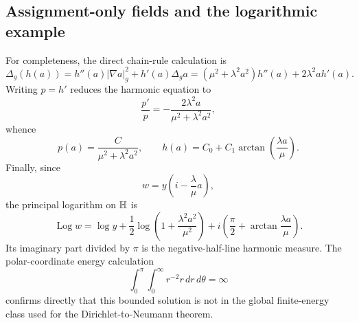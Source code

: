 \subsection{Assignment-only fields and the logarithmic example}

For completeness, the direct chain-rule calculation is
\[
 \Delta_g(h(a))
 =h''(a)|\nabla a|_g^2+h'(a)\Delta_ga
 =(\mu^2+\lambda^2a^2)h''(a)+2\lambda^2ah'(a).
\]
Writing $p=h'$ reduces the harmonic equation to
\[
 \frac{p'}p=-\frac{2\lambda^2a}{\mu^2+\lambda^2a^2},
\]
whence
\[
 p(a)=\frac{C}{\mu^2+\lambda^2a^2},
 \qquad
 h(a)=C_0+C_1\arctan\left(\frac{\lambda a}{\mu}\right).
\]
Finally, since
\[
 w=y\left(i-\frac\lambda\mu a\right),
\]
the principal logarithm on $\mathbb{H}$ is
\[
 \operatorname{Log} w
 =\log y+\frac12\log\left(1+\frac{\lambda^2a^2}{\mu^2}\right)
 +i\left(\frac\pi2+\arctan\frac{\lambda a}{\mu}\right).
\]
Its imaginary part divided by $\pi$ is the negative-half-line harmonic
measure.  The polar-coordinate energy calculation
\[
 \int_0^\pi\int_0^\infty r^{-2}r\,dr\,d\theta=\infty
\]
confirms directly that this bounded solution is not in the global finite-energy
class used for the Dirichlet-to-Neumann theorem.
